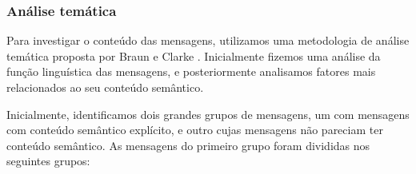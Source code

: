 
\subsubsection{Análise temática}
\label{sec:thematic}

Para investigar o conteúdo das mensagens, utilizamos uma metodologia de análise temática proposta por Braun e Clarke \cite{Braun2006}. Inicialmente fizemos uma análise da função linguística das mensagens, e posteriormente analisamos fatores mais relacionados ao seu conteúdo semântico.



Inicialmente, identificamos dois grandes grupos de mensagens, um com mensagens com conteúdo semântico explícito, e outro cujas mensagens não pareciam ter conteúdo semântico. As mensagens do primeiro grupo foram divididas nos seguintes grupos:


